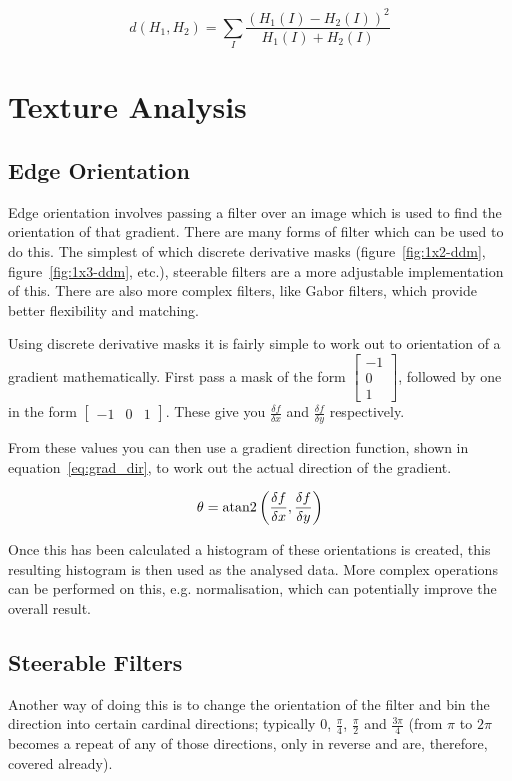 \begin{equation}\label{eq:chi_squared}
d(H_1,H_2) =\sum_I{\frac{(H_1(I) - H_2(I))^2}{H_1(I) + H_2(I)}}
\end{equation}


\section{Texture Analysis}

\subsection{Edge Orientation}
Edge orientation involves passing a filter over an image which is used to find the orientation of
that gradient. There are many forms of filter which can be used to do this. The simplest of which
discrete derivative masks (figure~\ref{fig:1x2-ddm}, figure~\ref{fig:1x3-ddm}, etc.), steerable 
filters are a more adjustable implementation of this. There are also more complex filters, like 
Gabor filters, which provide better flexibility and matching.

Using discrete derivative masks it is fairly simple to work out to orientation of a gradient 
mathematically. First pass a mask of the form $\begin{bmatrix}-1\\0\\1\end{bmatrix}$, followed
by one in the form $\begin{bmatrix}-1 & 0 & 1\end{bmatrix}$. These give you 
$\frac{\delta f}{\delta x}$ and $\frac{\delta f}{\delta y}$ respectively.

From these values you can then use a gradient direction function, shown in 
equation~\ref{eq:grad_dir}, to work out the actual direction of the gradient.

\begin{equation} \label{eq:grad_dir}
\theta = {\rm atan2}\left( \frac{\delta f}{\delta x}, \frac{\delta f}{\delta y} \right)
\end{equation}

Once this has been calculated a histogram of these orientations is created, this resulting
histogram is then used as the analysed data. More complex operations can be performed on this,
e.g. normalisation, which can potentially improve the overall result.


\subsection{Steerable Filters}
Another way of doing this is to change the orientation of the filter and bin the direction into 
certain cardinal directions; typically $0$, $\frac{\pi}{4}$, $\frac{\pi}{2}$ and $\frac{3\pi}{4}$
(from $\pi$ to $2\pi$ becomes a repeat of any of those directions, only in reverse and are, 
therefore, covered already).

